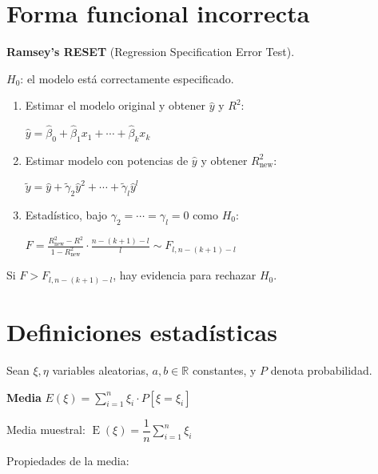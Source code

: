 \documentclass[10pt, a4paper, landscape]{article}
\DeclareMathOperator{\E}{E}
\begin{document}
\begin{multicols}{3}
\columnbreak

\section*{Forma funcional incorrecta}

\textbf{Ramsey's RESET} (Regression Specification Error Test).

\begin{center}
	\( H_{0} \): el modelo está correctamente especificado.
\end{center}

\begin{enumerate}[leftmargin=*]
	\item Estimar el modelo original y obtener  \( \hat{y} \) y \( R^{2} \):
	\begin{center}
		\( \hat{y} = \hat{\beta}_{0} + \hat{\beta}_{1} x_{1} + \cdots + \hat{\beta}_{k} x_{k} \)
	\end{center}
	\item Estimar modelo con potencias de \( \hat{y} \) y obtener \( R_{\text{new}}^{2} \):
	\begin{center}
		\( \tilde{y} = \hat{y} + \tilde{\gamma}_{2} \hat{y}^{2} + \cdots + \tilde{\gamma}_{l} \hat{y}^{l} \)
	\end{center}
	\item Estadístico, bajo \( \gamma_{2} = \cdots = \gamma_{l} = 0 \) como \( H_{0} \):
	\begin{center}
		\( F = \frac{R_{\text{new}}^{2} - R^{2}}{1 - R_{\text{new}}^{2}} \cdot \frac{n - (k + 1) - l}{l} \sim F_{l, n - (k + 1) - l} \)
	\end{center}
\end{enumerate}

Si \( F > F_{l, n - (k + 1) - l} \), hay evidencia para rechazar \( H_{0} \).

\section*{Definiciones estadísticas}

Sean \( \xi, \eta \) variables aleatorias, \( a, b \in \mathbb{R} \) constantes, y \( P \) denota probabilidad.

\textbf{Media} \quad \( E(\xi) = \sum_{i = 1}^{n} \xi_{i} \cdot P[\xi = \xi_{i}] \)

Media muestral: \quad \( \E(\xi) = \dfrac{1}{n} \sum_{i = 1}^{n} \xi_{i} \)

Propiedades de la media:


\end{multicols}
\end{document}
